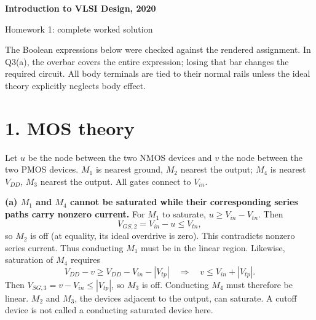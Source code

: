 \documentclass[11pt]{article}
\newcommand{\mos}[4]{\begin{scope}[shift={(#1,#2)}]
\draw (0,.24)--(0,-.24);
\draw (0,.20)--(.25,.20)--(.25,.5);
\draw (0,-.20)--(.25,-.20)--(.25,-.5);
\draw (-.16,.23)--(-.16,-.23);
\ifnum#4=1\draw (-.26,0) circle (.06);\draw (-.75,0)--(-.32,0);\else\draw (-.75,0)--(-.16,0);\fi
\node[anchor=east,font=\small] at (-.76,0) {$#3$};
\end{scope}}
\newcommand{\ground}[2]{\draw (#1,#2)--(#1,{#2-.12});\draw ({#1-.17},{#2-.12})--({#1+.17},{#2-.12});\draw ({#1-.11},{#2-.20})--({#1+.11},{#2-.20});}
\newcommand{\rail}[3]{\draw (#1,#2)--(#1,{#2+.15});\node[above,font=\small] at (#1,{#2+.15}) {$#3$};}
\newcommand{\outputnode}[3]{\fill (#1,#2) circle (.04);\draw (#1,#2)--({#1+.7},#2) node[right] {$#3$};}
\begin{document}
\begin{center}{\Large\bfseries Introduction to VLSI Design, 2020}\par{\large Homework 1: complete worked solution}\end{center}
The Boolean expressions below were checked against the rendered assignment. In Q3(a), the overbar covers the entire expression; losing that bar changes the required circuit. All body terminals are tied to their normal rails unless the ideal theory explicitly neglects body effect.

\section*{1. MOS theory}
Let $u$ be the node between the two NMOS devices and $v$ the node between the two PMOS devices. $M_1$ is nearest ground, $M_2$ nearest the output; $M_4$ is nearest $V_{DD}$, $M_3$ nearest the output. All gates connect to $V_{in}$.
\begin{center}\end{center}

\textbf{(a) $M_1$ and $M_4$ cannot be saturated while their corresponding series paths carry nonzero current.}
For $M_1$ to saturate, $u\ge V_{in}-V_{tn}$. Then
\[
 V_{GS,2}=V_{in}-u\le V_{tn},
\]
so $M_2$ is off (at equality, its ideal overdrive is zero). This contradicts nonzero series current. Thus conducting $M_1$ must be in the linear region. Likewise, saturation of $M_4$ requires
\[
 V_{DD}-v\ge V_{DD}-V_{in}-|V_{tp}| \quad\Longrightarrow\quad v\le V_{in}+|V_{tp}|.
\]
Then $V_{SG,3}=v-V_{in}\le |V_{tp}|$, so $M_3$ is off. Conducting $M_4$ must therefore be linear. $M_2$ and $M_3$, the devices adjacent to the output, can saturate. A cutoff device is not called a conducting saturated device here.
\end{document}
